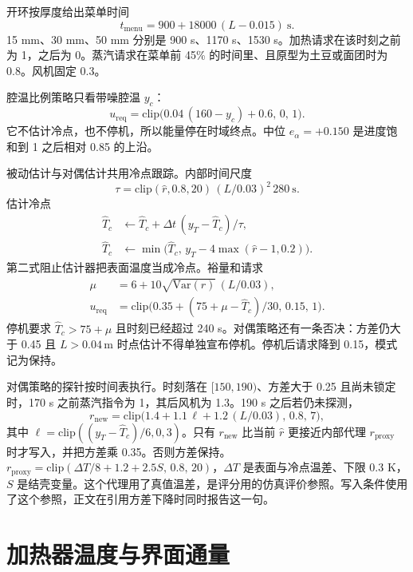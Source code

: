 开环按厚度给出菜单时间
\begin{equation}
t_{\mathrm{menu}}=900+18000\,(L-0.015)\ \mathrm{s}.
\end{equation}
15 mm、30 mm、50 mm 分别是 900 s、1170 s、1530 s。加热请求在该时刻之前为 1，之后为 0。蒸汽请求在菜单前 45\% 的时间里、且原型为土豆或面团时为 0.8。风机固定 0.3。

腔温比例策略只看带噪腔温 \(y_c\)：
\begin{equation}
u_{\mathrm{req}}=\mathrm{clip}\big(0.04\,(160-y_c)+0.6,\,0,\,1\big).
\end{equation}
它不估计冷点，也不停机，所以能量停在时域终点。中位 \(e_{\alpha}=+0.150\) 是进度饱和到 1 之后相对 0.85 的上沿。

被动估计与对偶估计共用冷点跟踪。内部时间尺度
\begin{equation}
\tau=\mathrm{clip}(\hat r,0.8,20)\,(L/0.03)^2\,280\ \mathrm{s}.
\end{equation}
估计冷点
\begin{align}
\hat T_c &\leftarrow \hat T_c+\Delta t\,(y_T-\hat T_c)/\tau,\\
\hat T_c &\leftarrow \min\big(\hat T_c,\, y_T-4\max(\hat r-1,0.2)\big).
\end{align}
第二式阻止估计器把表面温度当成冷点。裕量和请求
\begin{align}
\mu &= 6+10\sqrt{\mathrm{Var}(r)}\,(L/0.03),\\
u_{\mathrm{req}} &= \mathrm{clip}\big(0.35+(75+\mu-\hat T_c)/30,\,0.15,\,1\big).
\end{align}
停机要求 \(\hat T_c>75+\mu\) 且时刻已经超过 240 s。对偶策略还有一条否决：方差仍大于 0.45 且 \(L>0.04\,\mathrm{m}\) 时点估计不得单独宣布停机。停机后请求降到 0.15，模式记为保持。

对偶策略的探针按时间表执行。时刻落在 \([150,190)\)、方差大于 0.25 且尚未锁定时，170 s 之前蒸汽指令为 1，其后风机为 1.3。190 s 之后若仍未探测，
\begin{equation}
r_{\mathrm{new}}=\mathrm{clip}\big(1.4+1.1\,\ell+1.2\,(L/0.03),\,0.8,\,7\big),
\end{equation}
其中 \(\ell=\mathrm{clip}((y_T-\hat T_c)/6,0,3)\)。只有 \(r_{\mathrm{new}}\) 比当前 \(\hat r\) 更接近内部代理 \(r_{\mathrm{proxy}}\) 时才写入，并把方差乘 0.35。否则方差保持。\(r_{\mathrm{proxy}}=\mathrm{clip}(\Delta T/8+1.2+2.5 S,\,0.8,\,20)\)，\(\Delta T\) 是表面与冷点温差、下限 0.3 K，\(S\) 是结壳变量。这个代理用了真值温差，是评分用的仿真评价参照。写入条件使用了这个参照，正文在引用方差下降时同时报告这一句。

\section{加热器温度与界面通量}

